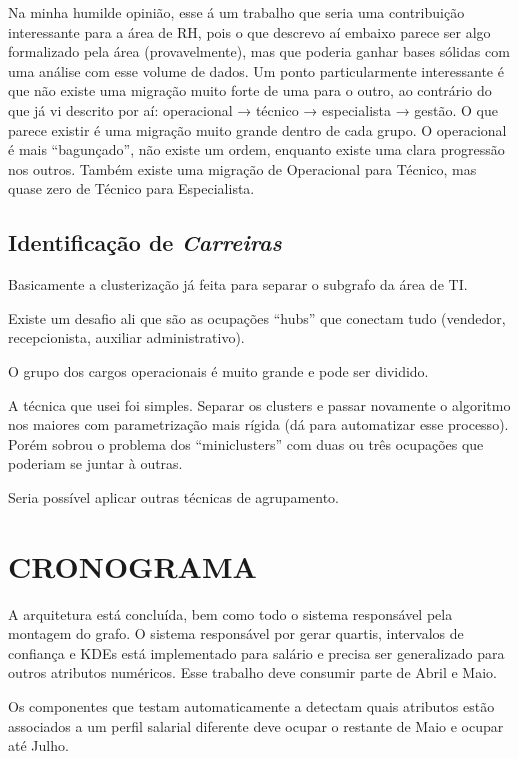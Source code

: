 \documentclass[12pt,a4paper]{article}
\begin{document}
Na minha humilde opinião, esse á um trabalho que seria uma contribuição interessante para a área de RH, pois o que descrevo aí embaixo parece ser algo formalizado pela área (provavelmente), mas que poderia ganhar bases sólidas com uma análise com esse volume de dados. Um ponto particularmente interessante é que não existe uma migração muito forte de uma para o outro, ao contrário do que já vi descrito por aí: operacional → técnico → especialista → gestão. O que parece existir é uma migração muito grande dentro de cada grupo. O operacional é mais \enquote{bagunçado}, não existe um ordem, enquanto existe uma clara progressão nos outros. Também existe uma migração de Operacional para Técnico, mas quase zero de Técnico para Especialista.

\subsection{Identificação de \textit{Carreiras}}

Basicamente a clusterização já feita para separar o subgrafo da área de TI.

Existe um desafio ali que são as ocupações \enquote{hubs} que conectam tudo (vendedor, recepcionista, auxiliar administrativo).

O grupo dos cargos operacionais é muito grande e pode ser dividido.

A técnica que usei foi simples. Separar os clusters e passar novamente o algoritmo nos maiores com parametrização mais rígida (dá para automatizar esse processo). Porém sobrou o problema dos \enquote{miniclusters} com duas ou três ocupações que poderiam se juntar à outras.

Seria possível aplicar outras técnicas de agrupamento.

\section{CRONOGRAMA}

A arquitetura está concluída, bem como todo o sistema responsável pela montagem do grafo. O sistema responsável por gerar quartis, intervalos de confiança e KDEs está implementado para salário e precisa ser generalizado para outros atributos numéricos. Esse trabalho deve consumir parte de Abril e Maio.

Os componentes que testam automaticamente a detectam quais atributos estão associados a um perfil salarial diferente deve ocupar o restante de Maio e ocupar até Julho.
\end{document}

